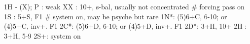 1H - (X);
P  : weak  
XX : 10+, s-bal, usually not concentrated  # forcing pass on
1S : 5+S, F1  # system on, may be psyche but rare
1N*: (5)6+C, 6-10; or (4)5+C, inv+. F1
2C*: (5)6+D, 6-10; or (4)5+D, inv+. F1
2D*: 3+H, 10+
2H : 3+H, 5-9
2S+: system on